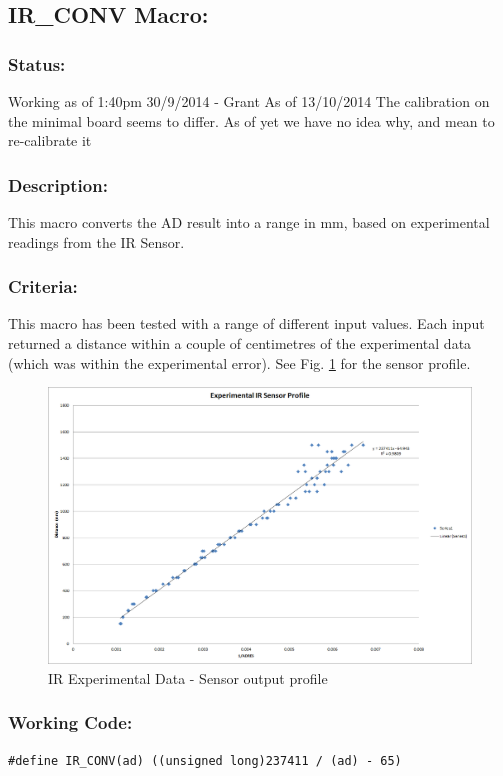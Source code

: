 \documentclass[]{report}
\begin{document}
\subsection{IR\_CONV Macro:}
\subsubsection{Status:}
Working as of 1:40pm 30/9/2014 - Grant \newline
As of 13/10/2014 The calibration on the minimal board seems to differ. As of yet we have no idea why, and mean to re-calibrate it

\subsubsection{Description:}
This macro converts the AD result into a range in mm, based on experimental readings from the IR Sensor.

\subsubsection{Criteria:}
This macro has been tested with a range of different input values. Each input returned a distance within a couple of centimetres of the experimental data (which was within the experimental error). See Fig. \ref{fig:IRExperimentalData} for the sensor profile.

\begin{figure}
\centering
\includegraphics[width=1\linewidth]{"IR Experimental Data"}
\caption{IR Experimental Data - Sensor output profile}
\label{fig:IRExperimentalData}
\end{figure}


\subsubsection{Working Code:}
\begin{lstlisting}
#define IR_CONV(ad) ((unsigned long)237411 / (ad) - 65)
\end{lstlisting}
\end{document}
